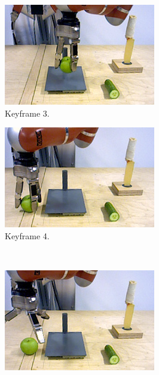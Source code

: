 \begin{figure}
\begin{subfigure}[t]{0.475\textwidth}
    \includegraphics[width=\textwidth]{./figures/sec/planning/exec4/frame0901.jpg}
    \caption{Keyframe 3.}
    \label{fig:sec_usingaffordanceforplanning_results_scenario4_3}
  \end{subfigure}
  \hfill
  \begin{subfigure}[t]{0.475\textwidth}
    \includegraphics[width=\textwidth]{./figures/sec/planning/exec4/frame1068.jpg}
    \caption{Keyframe 4.}
    \label{fig:sec_usingaffordanceforplanning_results_scenario4_4}
  \end{subfigure}\\%
  \begin{subfigure}[t]{0.475\textwidth}
    \includegraphics[width=\textwidth]{./figures/sec/planning/exec4/frame1321.jpg}

\end{subfigure}
\end{figure}
